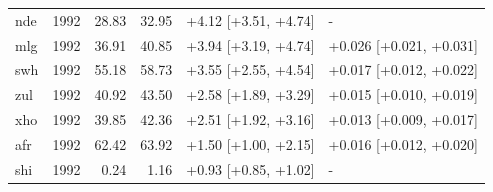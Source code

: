 {\begin{longtable}{@{}lrrrll@{}}
nde & 1992 & 28.83 & 32.95 & +4.12 [+3.51, +4.74] & - \\
mlg & 1992 & 36.91 & 40.85 & +3.94 [+3.19, +4.74] & +0.026 [+0.021, +0.031] \\
swh & 1992 & 55.18 & 58.73 & +3.55 [+2.55, +4.54] & +0.017 [+0.012, +0.022] \\
zul & 1992 & 40.92 & 43.50 & +2.58 [+1.89, +3.29] & +0.015 [+0.010, +0.019] \\
xho & 1992 & 39.85 & 42.36 & +2.51 [+1.92, +3.16] & +0.013 [+0.009, +0.017] \\
afr & 1992 & 62.42 & 63.92 & +1.50 [+1.00, +2.15] & +0.016 [+0.012, +0.020] \\
shi & 1992 & 0.24 & 1.16 & +0.93 [+0.85, +1.02] & - \\
\end{longtable}
}

